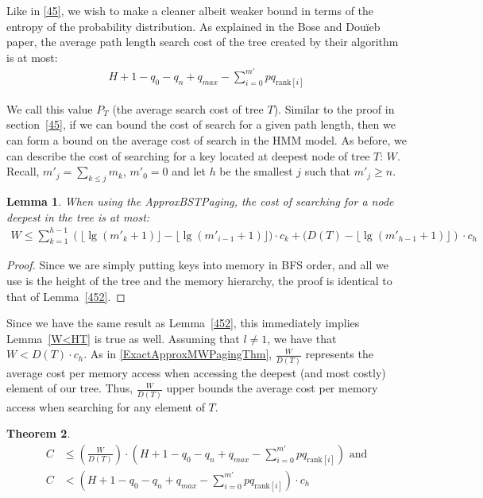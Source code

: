 \documentclass[letterpaper,12pt,titlepage,oneside,final]{book}
\theoremstyle{plain}
\newtheorem{thm}{Theorem}[section]
\newtheorem{lem}[thm]{Lemma}
\begin{document}
Like in \ref{45}, we wish to make a cleaner albeit weaker bound in terms of the entropy of the probability distribution. As explained in the Bose and Dou\"{i}eb paper, the average path length search cost of the tree created by their algorithm is at most: \cite{bose2009efficient}
\begin{align*}
H + 1 - q_0 - q_n + q_{max} - \sum_{i=0}^{m'} pq_{\text{rank}[i]}
\end{align*}

We call this value $P_T$ (the average search cost of tree $T$). Similar to the proof in section~\ref{45}, if we can bound the cost of search for a given path length, then we can form a bound on the average cost of search in the HMM model. As before, we can describe the cost of searching for a key located at deepest node of tree $T$: $W$. Recall, $m'_j = \sum_{k \leq j} m_k$, $m'_0 = 0$ and let $h$ be the smallest $j$ such that $m'_j \geq n$.

\begin{lem} 
When using the ApproxBSTPaging, the cost of searching for a node deepest in the tree is at most:
\begin{align*}
W \leq \sum_{k=1}^{h-1} \left(\lfloor \lg(m'_k+1) \rfloor - \lfloor \lg(m'_{i-1}+1) \rfloor)\cdot c_k+ (D(T) - \lfloor \lg(m'_{h-1}+1) \rfloor \right)\cdot c_h
\end{align*}
\end{lem}

\begin{proof}
Since we are simply putting keys into memory in BFS order, and all we use is the height of the tree and the memory hierarchy, the proof is identical to that of Lemma~\ref{452}.
\end{proof}

Since we have the same result as Lemma~\ref{452}, this immediately implies Lemma~\ref{W<HT} is true as well. Assuming that $l \neq 1$, we have that $W<D(T)\cdot c_h$. As in \ref{ExactApproxMWPagingThm}, $\frac{W}{D(T)}$ represents the average cost per memory access when accessing the deepest (and most costly) element of our tree. Thus, $\frac{W}{D(T)}$ upper bounds the average cost per memory access when searching for any element of $T$.
\\

\begin{thm} \label{ApproxBSTThm}
\begin{align*}
C &\leq  (\frac{W}{D(T)}) \cdot  (H + 1 - q_0 - q_n + q_{max} - \sum_{i=0}^{m'} pq_{\text{rank}[i]}) \text{ and} \\
C &<  (H + 1 - q_0 - q_n + q_{max} - \sum_{i=0}^{m'} pq_{\text{rank}[i]})\cdot c_h
\end{align*}
\end{thm}
\end{document}
